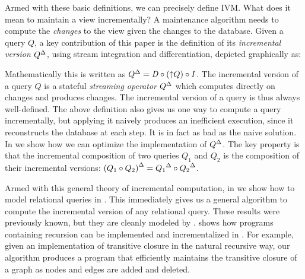 Armed with these basic definitions, we can precisely define IVM.  What
does it mean to maintain a view incrementally?  A maintenance
algorithm needs to compute the \emph{changes} to the view given the
changes to the database. Given a query $Q$, a key contribution of this
paper is the definition of its \emph{incremental version} ${Q}^{\Delta}$,
using stream integration and differentiation, depicted graphically as:
%
\begin{center}
\end{center}
%
Mathematically this is written as ${Q}^{\Delta} = \mathit{D} \circ ({\uparrow}Q) \circ
\mathit{I}$.  The incremental version of a query $Q$ is a stateful
\emph{streaming operator} ${Q}^{\Delta}$ which computes directly on changes
and produces changes.  The incremental version of a query is thus
always well-defined.  The above definition also gives us one way to
compute a query incrementally, but applying it naively produces an
inefficient execution, since it reconstructs the database at each
step.  It is in fact as bad as the naive solution.  In
 we show how we can optimize the
implementation of ${Q}^{\Delta}$. The key property is that the incremental
composition of two queries $Q_1$ and $Q_2$ is the composition of their
incremental versions: ${(Q_1 \circ Q_2)}^{\Delta} = {Q_1}^{\Delta} \circ
{Q_2}^{\Delta}$.

Armed with this general theory of incremental computation, in
 we show how to model relational queries in
\dbsp.  This immediately gives us a general algorithm to compute the
incremental version of any relational query.  These results were
previously known, but they are cleanly modeled by \dbsp.
 shows how programs containing recursion can be
implemented and incrementalized in \dbsp.  For example, given an
implementation of transitive closure in the natural recursive way, our
algorithm produces a program that efficiently maintains the transitive
closure of a graph as nodes and edges are added and deleted.

